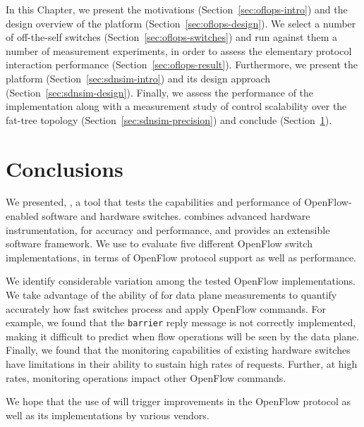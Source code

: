 In this Chapter, we present the motivations (Section~\ref{sec:oflops-intro}) and
the design overview of the \oflops platform (Section~\ref{sec:oflops-design}).
We select a number of off-the-self \of switches
(Section~\ref{sec:oflops-switches}) and run against them a number of measurement
experiments, in order to assess the elementary protocol interaction performance
(Section~\ref{sec:oflops-result}). Furthermore, we present the \sdnsim platform
(Section~\ref{sec:sdnsim-intro}) and its design approach
(Section~\ref{sec:sdnsim-design}). Finally, we assess the performance of the
\sdnsim implementation along with a measurement study of control
scalability over the fat-tree topology (Section~\ref{sec:sdnsim-precision})
and conclude (Section~\ref{sec:conclusion}). 


\section{\oflops Conclusions}\label{sec:conclusion}
We presented, \oflops, a tool that tests the capabilities and performance of 
OpenFlow-enabled software and hardware switches. \oflops combines advanced 
hardware instrumentation, for accuracy and performance, and provides an extensible 
software framework. We use \oflops to evaluate five different OpenFlow switch 
implementations, in terms of OpenFlow protocol support as well as performance.

We identify considerable variation among the tested OpenFlow implementations.
We take advantage of the ability of \oflops for data plane measurements to
quantify accurately how fast switches process and apply OpenFlow commands.
For example, we found that the \texttt{barrier} reply message is not correctly implemented,
making it difficult to predict when flow operations will be seen by the data plane.
Finally, we found that the monitoring capabilities of existing hardware switches 
have limitations in their ability to sustain high rates of requests. Further, at high 
rates, monitoring operations impact other OpenFlow commands.

We hope that the use of \oflops will trigger improvements in the
OpenFlow protocol as well as its implementations by various vendors.



